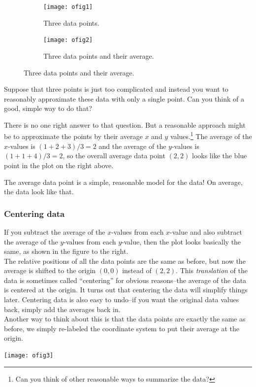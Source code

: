 \documentclass[10pt]{article}
\begin{document}
\begin{figure}[h!]
\centering
\begin{subfigure}{0.4\textwidth}
\texttt{[image: ofig1]}
\caption*{Three data points.}
\end{subfigure}
\hspace{0.1\textwidth}
\begin{subfigure}{0.4\textwidth}
\texttt{[image: ofig2]}
\caption*{Three data points and their average.}
\end{subfigure}
\end{figure}


Suppose that three points is just too complicated and instead you want to
reasonably approximate these data with only a single point. Can you think of a
good, simple way to do that?

There is no one right answer to that question. But a reasonable approach
might be to approximate the points by their average $x$ and $y$
values.\footnote{Can you think of other reasonable ways to summarize the data?}
The average of the $x$-values is $(1 + 2 + 3) / 3 = 2$ and the average of the
$y$-values is $(1 + 1+ 4)/3 = 2$, so the overall average data point $(2,2)$
looks like the blue point in the plot on the right above.


The average data point is a simple, reasonable model for the data! On
average, the data look like that.

\subsubsection*{Centering data}

\begin{minipage}[ht]{0.5\textwidth}
If you subtract the average of the $x$-values from each $x$-value and also
subtract the average of the $y$-values from each $y$-value, then the plot looks
basically the same, as shown in the figure to the right.\\[10pt]

The relative positions of all the data points are the same as before, but
now the average is shifted to the origin $(0,0)$ instead of $(2, 2)$. This {\it
translation} of the data is sometimes called ``centering'' for obvious
reasons--the average of the data is centered at the origin. It turns out that
centering the data will simplify things later. Centering data is
also easy to undo--if you want the original data values back, simply
add the averages back in.\\[10pt]

Another way to think about this is that the data points are exactly
the same as before, we simply re-labeled the coordinate system to put
their average at the origin.
\end{minipage}
\begin{minipage}[c]{0.5\textwidth}
\begin{center}
\texttt{[image: ofig3]}
\end{center}
\end{minipage}
\end{document}
